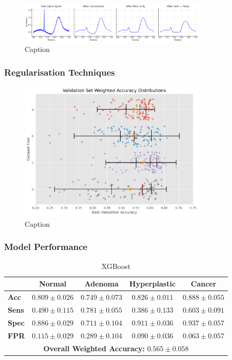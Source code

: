 \begin{figure}[htbp]
  \centering
  \includegraphics[width=0.8\textwidth]{Images/Tanh_Relu_Demo.png}
  \caption{Caption}
  \label{fig:my-label}
\end{figure}
\subsubsection{Regularisation Techniques}

\begin{figure}[htbp] 
    \centering 
    \includegraphics[width=0.8\textwidth]{Images/best_val_accuracy.png} 
    \caption{Caption} \label{fig:my-label}
\end{figure}

\subsubsection{Model Performance}
\begin{table}[ht] \centering \caption{XGBoost} \label{tab:xgboost}
\begin{tabular}{lcccc} \toprule & \textbf{Normal} & \textbf{Adenoma} &
\textbf{Hyperplastic} & \textbf{Cancer} \\ \midrule \textbf{Acc} & $0.809\pm0.
026$ & $0.749\pm0.073$ & $0.826\pm0.011$ & $0.888\pm0.055$ \\ \textbf{Sens} & $0.
490\pm0.115$ & $0.781\pm0.055$ & $0.386\pm0.133$ & $0.603\pm0.091$ \\
\textbf{Spec} & $0.886\pm0.029$ & $0.711\pm0.104$ & $0.911\pm0.036$ & $0.937\pm0.
057$ \\ \textbf{FPR} & $0.115\pm0.029$ & $0.289\pm0.104$ & $0.090\pm0.036$ & $0.
063\pm0.057$ \\ \midrule \multicolumn{5}{c}{\textbf{Overall Weighted Accuracy:}
$0.565\pm0.058$} \\ \bottomrule \end{tabular} \end{table}

